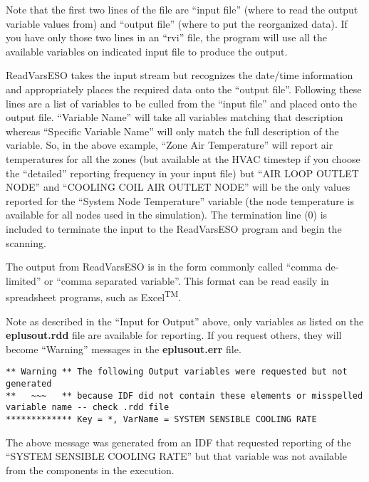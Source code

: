Note that the first two lines of the file are ``input file'' (where to read the output variable values from) and ``output file'' (where to put the reorganized data). If you have only those two lines in an ``rvi'' file, the program will use all the available variables on indicated input file to produce the output.

ReadVarsESO takes the input stream but recognizes the date/time information and appropriately places the required data onto the ``output file''. Following these lines are a list of variables to be culled from the ``input file'' and placed onto the output file. ``Variable Name'' will take all variables matching that description whereas ``Specific Variable Name'' will only match the full description of the variable. So, in the above example, ``Zone Air Temperature'' will report air temperatures for all the zones (but available at the HVAC timestep if you choose the ``detailed'' reporting frequency in your input file) but ``AIR LOOP OUTLET NODE'' and ``COOLING COIL AIR OUTLET NODE'' will be the only values reported for the ``System Node Temperature'' variable (the node temperature is available for all nodes used in the simulation). The termination line (0) is included to terminate the input to the ReadVarsESO program and begin the scanning.

The output from ReadVarsESO is in the form commonly called ``comma de-limited'' or ``comma separated variable''. This format can be read easily in spreadsheet programs, such as Excel\textsuperscript{TM}.

Note as described in the ``Input for Output'' above, only variables as listed on the \textbf{eplusout.rdd} file are available for reporting. If you request others, they will become ``Warning'' messages in the \textbf{eplusout.err} file.

\begin{lstlisting}
** Warning ** The following Output variables were requested but not generated
**   ~~~   ** because IDF did not contain these elements or misspelled variable name -- check .rdd file
************* Key = *, VarName = SYSTEM SENSIBLE COOLING RATE
\end{lstlisting}

The above message was generated from an IDF that requested reporting of the ``SYSTEM SENSIBLE COOLING RATE'' but that variable was not available from the components in the execution.

